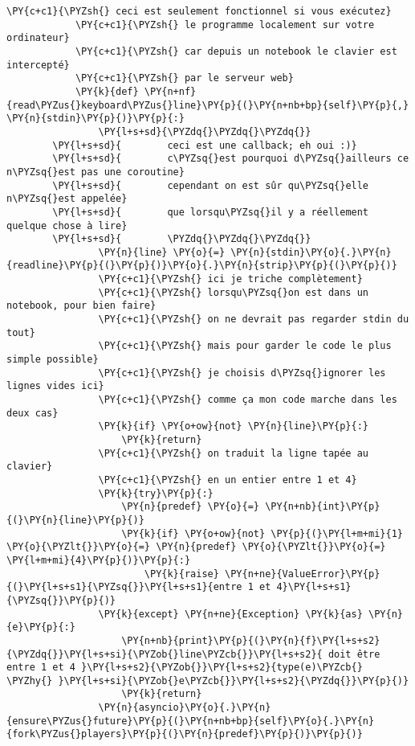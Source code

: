 \begin{Verbatim}[commandchars=\\\{\}]
            \PY{c+c1}{\PYZsh{} ceci est seulement fonctionnel si vous exécutez}
            \PY{c+c1}{\PYZsh{} le programme localement sur votre ordinateur}
            \PY{c+c1}{\PYZsh{} car depuis un notebook le clavier est intercepté}
            \PY{c+c1}{\PYZsh{} par le serveur web}
            \PY{k}{def} \PY{n+nf}{read\PYZus{}keyboard\PYZus{}line}\PY{p}{(}\PY{n+nb+bp}{self}\PY{p}{,} \PY{n}{stdin}\PY{p}{)}\PY{p}{:}
                \PY{l+s+sd}{\PYZdq{}\PYZdq{}\PYZdq{}}
        \PY{l+s+sd}{        ceci est une callback; eh oui :)}
        \PY{l+s+sd}{        c\PYZsq{}est pourquoi d\PYZsq{}ailleurs ce n\PYZsq{}est pas une coroutine}
        \PY{l+s+sd}{        cependant on est sûr qu\PYZsq{}elle n\PYZsq{}est appelée}
        \PY{l+s+sd}{        que lorsqu\PYZsq{}il y a réellement quelque chose à lire}
        \PY{l+s+sd}{        \PYZdq{}\PYZdq{}\PYZdq{}}
                \PY{n}{line} \PY{o}{=} \PY{n}{stdin}\PY{o}{.}\PY{n}{readline}\PY{p}{(}\PY{p}{)}\PY{o}{.}\PY{n}{strip}\PY{p}{(}\PY{p}{)}
                \PY{c+c1}{\PYZsh{} ici je triche complètement}
                \PY{c+c1}{\PYZsh{} lorsqu\PYZsq{}on est dans un notebook, pour bien faire}
                \PY{c+c1}{\PYZsh{} on ne devrait pas regarder stdin du tout}
                \PY{c+c1}{\PYZsh{} mais pour garder le code le plus simple possible}
                \PY{c+c1}{\PYZsh{} je choisis d\PYZsq{}ignorer les lignes vides ici}
                \PY{c+c1}{\PYZsh{} comme ça mon code marche dans les deux cas}
                \PY{k}{if} \PY{o+ow}{not} \PY{n}{line}\PY{p}{:}
                    \PY{k}{return}
                \PY{c+c1}{\PYZsh{} on traduit la ligne tapée au clavier}
                \PY{c+c1}{\PYZsh{} en un entier entre 1 et 4}
                \PY{k}{try}\PY{p}{:}
                    \PY{n}{predef} \PY{o}{=} \PY{n+nb}{int}\PY{p}{(}\PY{n}{line}\PY{p}{)}
                    \PY{k}{if} \PY{o+ow}{not} \PY{p}{(}\PY{l+m+mi}{1} \PY{o}{\PYZlt{}}\PY{o}{=} \PY{n}{predef} \PY{o}{\PYZlt{}}\PY{o}{=} \PY{l+m+mi}{4}\PY{p}{)}\PY{p}{:}
                        \PY{k}{raise} \PY{n+ne}{ValueError}\PY{p}{(}\PY{l+s+s1}{\PYZsq{}}\PY{l+s+s1}{entre 1 et 4}\PY{l+s+s1}{\PYZsq{}}\PY{p}{)}
                \PY{k}{except} \PY{n+ne}{Exception} \PY{k}{as} \PY{n}{e}\PY{p}{:}
                    \PY{n+nb}{print}\PY{p}{(}\PY{n}{f}\PY{l+s+s2}{\PYZdq{}}\PY{l+s+si}{\PYZob{}line\PYZcb{}}\PY{l+s+s2}{ doit être entre 1 et 4 }\PY{l+s+s2}{\PYZob{}}\PY{l+s+s2}{type(e)\PYZcb{} \PYZhy{} }\PY{l+s+si}{\PYZob{}e\PYZcb{}}\PY{l+s+s2}{\PYZdq{}}\PY{p}{)}
                    \PY{k}{return}
                \PY{n}{asyncio}\PY{o}{.}\PY{n}{ensure\PYZus{}future}\PY{p}{(}\PY{n+nb+bp}{self}\PY{o}{.}\PY{n}{fork\PYZus{}players}\PY{p}{(}\PY{n}{predef}\PY{p}{)}\PY{p}{)}
\end{Verbatim}


